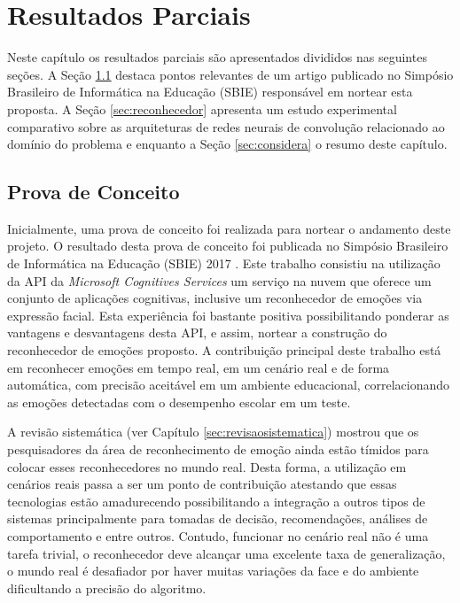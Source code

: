 \chapter{Resultados Parciais}\label{sec:resultados}
Neste capítulo os resultados parciais são apresentados divididos nas seguintes seções. A Seção \ref{sec:prova} destaca pontos relevantes de um artigo publicado no Simpósio Brasileiro de Informática na Educação (SBIE) responsável em nortear esta proposta. A Seção \ref{sec:reconhecedor} apresenta um estudo experimental comparativo sobre as arquiteturas de redes neurais de convolução relacionado ao domínio do problema e enquanto a Seção \ref{sec:considera} o resumo deste capítulo.   


\section{Prova de Conceito}\label{sec:prova}
Inicialmente, uma prova de conceito foi realizada para nortear o andamento deste projeto. O resultado desta prova de conceito foi publicada no Simpósio Brasileiro de Informática na Educação (SBIE) 2017 \citep{cruz2017framework}. Este trabalho consistiu na utilização da API da \textit{Microsoft Cognitives Services} um serviço na nuvem que oferece um conjunto de aplicações cognitivas, inclusive um reconhecedor de emoções via expressão facial. Esta experiência foi bastante positiva possibilitando ponderar as vantagens e desvantagens desta API, e assim, nortear a construção do reconhecedor de emoções proposto. A contribuição principal deste trabalho está em reconhecer emoções em tempo real, em um cenário real e de forma automática, com precisão aceitável em um ambiente educacional, correlacionando as emoções detectadas com o desempenho escolar em um teste. 

A revisão sistemática (ver Capítulo \ref{sec:revisaosistematica}) mostrou que os pesquisadores da área de reconhecimento de emoção ainda estão tímidos para colocar esses reconhecedores no mundo real. Desta forma, a utilização em cenários reais passa a ser um ponto de contribuição atestando que essas tecnologias estão amadurecendo possibilitando a integração a outros tipos de sistemas principalmente para tomadas de decisão, recomendações, análises de comportamento e entre outros. Contudo, funcionar no cenário real não é uma tarefa trivial, o reconhecedor deve alcançar uma excelente taxa de generalização, o mundo real é desafiador por haver muitas variações da face e do ambiente dificultando a precisão do algoritmo.  

